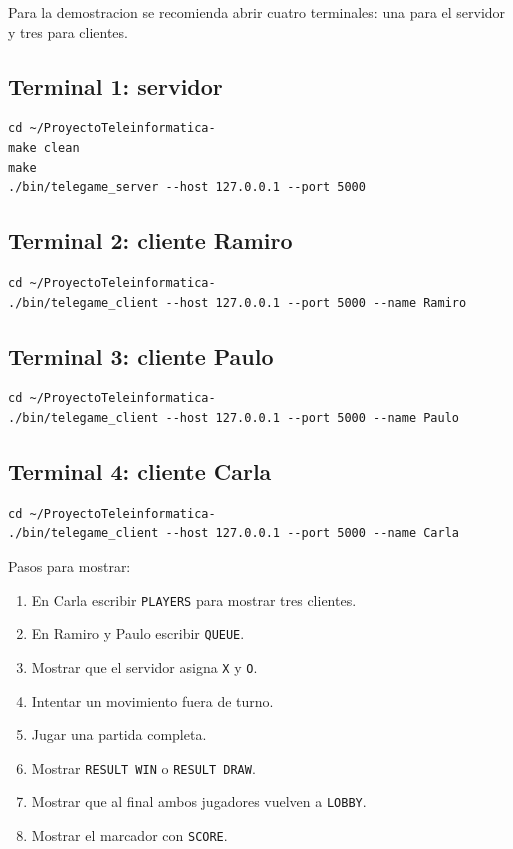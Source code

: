 \documentclass[12pt,a4paper]{article}
\begin{document}
Para la demostracion se recomienda abrir cuatro terminales: una para el servidor
y tres para clientes.

\subsection{Terminal 1: servidor}

\begin{lstlisting}[style=code]
cd ~/ProyectoTeleinformatica-
make clean
make
./bin/telegame_server --host 127.0.0.1 --port 5000
\end{lstlisting}

\subsection{Terminal 2: cliente Ramiro}

\begin{lstlisting}[style=code]
cd ~/ProyectoTeleinformatica-
./bin/telegame_client --host 127.0.0.1 --port 5000 --name Ramiro
\end{lstlisting}

\subsection{Terminal 3: cliente Paulo}

\begin{lstlisting}[style=code]
cd ~/ProyectoTeleinformatica-
./bin/telegame_client --host 127.0.0.1 --port 5000 --name Paulo
\end{lstlisting}

\subsection{Terminal 4: cliente Carla}

\begin{lstlisting}[style=code]
cd ~/ProyectoTeleinformatica-
./bin/telegame_client --host 127.0.0.1 --port 5000 --name Carla
\end{lstlisting}

Pasos para mostrar:

\begin{enumerate}
    \item En Carla escribir \texttt{PLAYERS} para mostrar tres clientes.
    \item En Ramiro y Paulo escribir \texttt{QUEUE}.
    \item Mostrar que el servidor asigna \texttt{X} y \texttt{O}.
    \item Intentar un movimiento fuera de turno.
    \item Jugar una partida completa.
    \item Mostrar \texttt{RESULT WIN} o \texttt{RESULT DRAW}.
    \item Mostrar que al final ambos jugadores vuelven a \texttt{LOBBY}.
    \item Mostrar el marcador con \texttt{SCORE}.
\end{enumerate}
\end{document}
